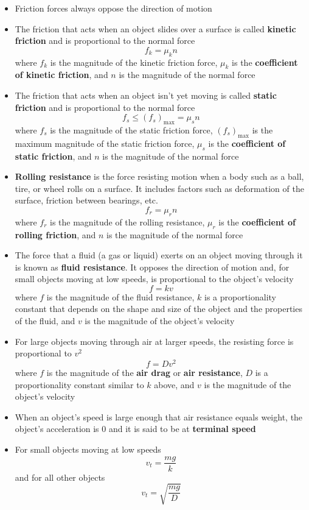 \documentclass{article}
\begin{document}
\begin{itemize}
  \item Friction forces always oppose the direction of motion

  \item The friction that acts when an object slides over a surface is called \textbf{kinetic friction} and is proportional to the normal force \[f_k=\mu_k n\] where $f_k$ is the magnitude of the kinetic friction force, $\mu_k$ is the \textbf{coefficient of kinetic friction}, and $n$ is the magnitude of the normal force

  \item The friction that acts when an object isn't yet moving is called \textbf{static friction} and is proportional to the normal force \[f_s\le\left(f_s\right)_\textrm{max}=\mu_s n\] where $f_s$ is the magnitude of the static friction force, $\left(f_s\right)_\textrm{max}$ is the maximum magnitude of the static friction force, $\mu_s$ is the \textbf{coefficient of static friction}, and $n$ is the magnitude of the normal force

  \item \textbf{Rolling resistance} is the force resisting motion when a body such as a ball, tire, or wheel rolls on a surface. It includes factors such as deformation of the surface, friction between bearings, etc. \[f_r=\mu_r n\] where $f_r$ is the magnitude of the rolling resistance, $\mu_r$ is the \textbf{coefficient of rolling friction}, and $n$ is the magnitude of the normal force

  \item The force that a fluid (a gas or liquid) exerts on an object moving through it is known as \textbf{fluid resistance}. It opposes the direction of motion and, for small objects moving at low speeds, is proportional to the object's velocity \[f=kv\] where $f$ is the magnitude of the fluid resistance, $k$ is a proportionality constant that depends on the shape and size of the object and the properties of the fluid, and $v$ is the magnitude of the object's velocity

  \item For large objects moving through air at larger speeds, the resisting force is proportional to $v^2$ \[f=Dv^2\] where $f$ is the magnitude of the \textbf{air drag} or \textbf{air resistance}, $D$ is a proportionality constant similar to $k$ above, and $v$ is the magnitude of the object's velocity

  \item When an object's speed is large enough that air resistance equals weight, the object's acceleration is 0 and it is said to be at \textbf{terminal speed}

  \item For small objects moving at low speeds \[v_t=\frac{mg}{k}\] and for all other objects \[v_t=\sqrt{\frac{mg}{D}}\]
\end{itemize}
\end{document}
